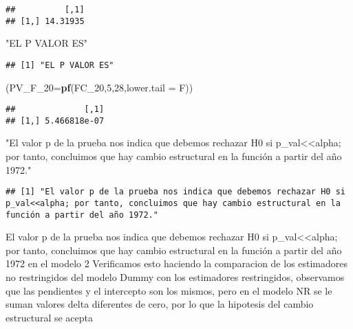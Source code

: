 \documentclass[
]{article}
\newenvironment{Shaded}{\begin{snugshade}}{\end{snugshade}}
\newcommand{\DataTypeTok}[1]{\textcolor[rgb]{0.13,0.29,0.53}{#1}}
\newcommand{\DecValTok}[1]{\textcolor[rgb]{0.00,0.00,0.81}{#1}}
\newcommand{\KeywordTok}[1]{\textcolor[rgb]{0.13,0.29,0.53}{\textbf{#1}}}
\newcommand{\NormalTok}[1]{#1}
\newcommand{\StringTok}[1]{\textcolor[rgb]{0.31,0.60,0.02}{#1}}
\begin{document}
\begin{verbatim}
##          [,1]
## [1,] 14.31935
\end{verbatim}

\begin{Shaded}
\begin{Highlighting}[]
\StringTok{"EL P VALOR ES"}
\end{Highlighting}
\end{Shaded}

\begin{verbatim}
## [1] "EL P VALOR ES"
\end{verbatim}

\begin{Shaded}
\begin{Highlighting}[]
\NormalTok{(}\DataTypeTok{PV_F_20=}\KeywordTok{pf}\NormalTok{(FC_}\DecValTok{20}\NormalTok{,}\DecValTok{5}\NormalTok{,}\DecValTok{28}\NormalTok{,}\DataTypeTok{lower.tail =}\NormalTok{ F))}
\end{Highlighting}
\end{Shaded}

\begin{verbatim}
##              [,1]
## [1,] 5.466818e-07
\end{verbatim}

\begin{Shaded}
\begin{Highlighting}[]
\StringTok{"El valor p de la prueba nos indica que debemos rechazar H0 si p_val<<alpha; por tanto, concluimos que hay cambio estructural en la función a partir del año 1972."}
\end{Highlighting}
\end{Shaded}

\begin{verbatim}
## [1] "El valor p de la prueba nos indica que debemos rechazar H0 si p_val<<alpha; por tanto, concluimos que hay cambio estructural en la función a partir del año 1972."
\end{verbatim}

El valor p de la prueba nos indica que debemos rechazar H0 si
p\_val\textless\textless alpha; por tanto, concluimos que hay cambio
estructural en la función a partir del año 1972 en el modelo 2
Verificamos esto haciendo la comparacion de los estimadores no
restringidos del modelo Dummy con los estimadores restringidos,
observamos que las pendientes y el intercepto son los mismos, pero en el
modelo NR se le suman valores delta diferentes de cero, por lo que la
hipotesis del cambio estructural se acepta
\end{document}
